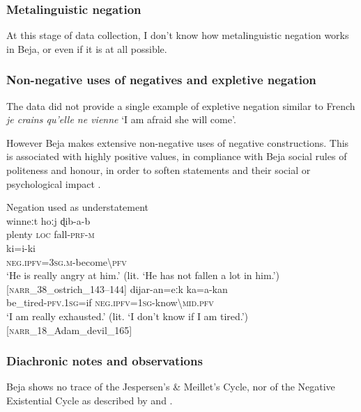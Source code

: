 \documentclass[output=paper,colorlinks,citecolor=brown]{langscibook}
\begin{document}
 \subsubsection{Metalinguistic negation}

At this stage of data collection, I don’t know how metalinguistic negation works in Beja, or even if it is at all possible.

 \subsubsection{Non-negative uses of negatives and expletive negation}
\label{sec:beja:4.6.3}
The data did not provide a single example of expletive negation similar to French \textit{je crains qu’elle ne vienne} ‘I am afraid she will come’.

However Beja makes extensive non-negative uses of negative constructions. This is associated with highly positive values, in compliance with Beja social rules of politeness and honour, in order to soften statements and their social or psychological impact . 

\ea\label{ex:beja:44}
{Negation used as understatement}\\
    \ea\label{ex:beja:44a}
         \gll winneːt hoːj ɖib-a-b\\
             plenty \textsc{loc} fall-\textsc{prf-m}\\
        \gll ki=i-ki\\
             \textsc{neg.ipfv=3sg.m}{}-become{\textbackslash}\textsc{pfv}\\
        \glt `He is really angry at him.' (lit. `He has not fallen a lot in him.') [\textsc{narr}\_38\_ostrich\_143–144]
    \ex\label{ex:beja:44b}    
        \gll dijar-an=eːk ka=a-kan\\
             be\_tired-\textsc{pfv.1sg=}if \textsc{neg.ipfv=1sg}-know{\textbackslash}\textsc{mid.pfv}\\
        \glt `I am really exhausted.' (lit. `I don’t know if I am tired.') [\textsc{narr}\_18\_Adam\_devil\_165]
    \z 
\z

\subsubsection{Diachronic notes and observations}

Beja shows no trace of the Jespersen’s \& Meillet’s Cycle, nor of the Negative Existential Cycle as described by \citet{Croft1991} and \citet{Veselinova2014}.
\end{document}
